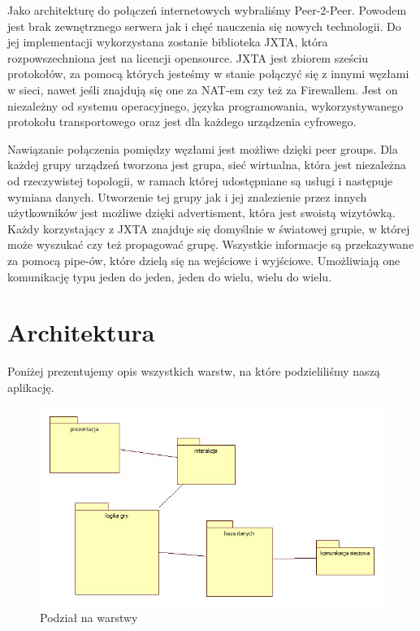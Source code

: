 \documentclass[a4paper, 11pt]{article}
\begin{document}
	Jako architekturę do połączeń internetowych wybraliśmy Peer-2-Peer. Powodem jest brak zewnętrznego serwera jak i chęć nauczenia się nowych technologii. Do jej implementacji wykorzystana zostanie biblioteka JXTA, która rozpowszechniona jest na licencji opensource. JXTA jest zbiorem sześciu protokołów, za pomocą których jesteśmy w stanie połączyć się z innymi węzłami w sieci, nawet jeśli znajdują się one za NAT-em czy też za Firewallem. Jest on niezależny od systemu operacyjnego, języka programowania, wykorzystywanego protokołu transportowego oraz jest dla każdego urządzenia cyfrowego. 
	
	Nawiązanie połączenia pomiędzy węzłami jest możliwe dzięki peer groups.  Dla każdej grupy urządzeń tworzona jest grupa, sieć wirtualna, która jest niezależna od rzeczywistej topologii, w ramach której udostępniane są usługi i następuje wymiana danych. Utworzenie tej grupy jak i jej znalezienie przez innych użytkowników jest możliwe dzięki advertisment, która jest swoistą wizytówką. Każdy korzystający z JXTA znajduje się domyślnie w światowej grupie, w której może wyszukać czy też propagować grupę. Wszystkie informacje są przekazywane za pomocą pipe-ów, które dzielą się na wejściowe i wyjściowe. Umożliwiają one komunikację typu jeden do jeden, jeden do wielu, wielu do wielu.
	
		
	\section{Architektura}
	\indent
	
	Poniżej prezentujemy opis wszystkich warstw, na które podzieliliśmy naszą aplikację.
	\begin{figure}[H]%
		\includegraphics[scale=0.5]{uml/main.jpg}\caption{Podział na warstwy}
	\end{figure}
	
\end{document}
